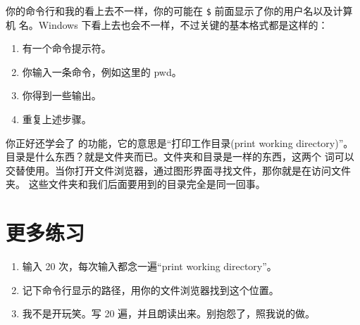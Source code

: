 你的命令行和我的看上去不一样，你的可能在 \verb|$| 前面显示了你的用户名以及计算机
名。Windows 下看上去也会不一样，不过关键的基本格式都是这样的：

\begin{enumerate}
\item 有一个命令提示符。
\item 你输入一条命令，例如这里的 pwd。
\item 你得到一些输出。
\item 重复上述步骤。
\end{enumerate}

你正好还学会了  的功能，它的意思是“打印工作目录(print working
directory)”。目录是什么东西？就是文件夹而已。文件夹和目录是一样的东西，这两个
词可以交替使用。当你打开文件浏览器，通过图形界面寻找文件，那你就是在访问文件夹。
这些文件夹和我们后面要用到的目录完全是同一回事。

\section{更多练习}

\begin{enumerate}
\item 输入  20 次，每次输入都念一遍“print working directory”。
\item 记下命令行显示的路径，用你的文件浏览器找到这个位置。
\item 我不是开玩笑。写 20 遍，并且朗读出来。别抱怨了，照我说的做。
\end{enumerate}



